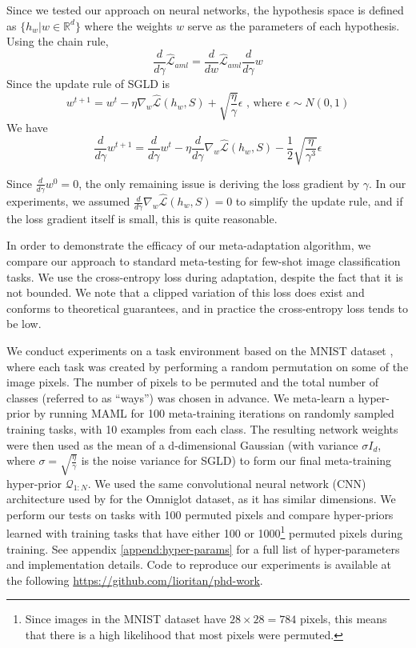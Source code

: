 \documentclass{article}
\theoremstyle{definition}
\begin{document}
Since we tested our approach on neural networks, the hypothesis space is defined as $\{h_w|w\in \mathbb{R}^d\}$ where the weights $w$ serve as the parameters of each hypothesis.
Using the chain rule, 
$$\frac{d}{d\gamma}\hat{\mathcal{L}}_{aml}=\frac{d}{dw}\hat{\mathcal{L}}_{aml}\frac{d}{d\gamma}w$$
Since the update rule of SGLD is 
$$w^{t+1}=w^t-\eta\nabla_w \hat{\mathcal{L}}(h_w,S)+\sqrt{\frac{\eta}{\gamma}}\epsilon \text{ , where } \epsilon\sim N(0,1)$$
We have
\begin{equation}
\frac{d}{d\gamma}w^{t+1}=\frac{d}{d\gamma}w^t-\eta\frac{d}{d\gamma}\nabla_w \hat{\mathcal{L}}(h_w,S)-\frac{1}{2}\sqrt{\frac{\eta}{\gamma^3}}\epsilon
\end{equation}

Since $\frac{d}{d\gamma}w^0=0$, the only remaining issue is deriving the loss gradient by $\gamma$. In our experiments, we assumed $\frac{d}{d\gamma}\nabla_w \hat{\mathcal{L}}(h_w,S)=0$ to simplify the update rule, and if the loss gradient itself is small, this is quite reasonable.

In order to demonstrate the efficacy of our meta-adaptation algorithm, we compare our approach to standard meta-testing for few-shot image classification tasks. 
We use the cross-entropy loss during adaptation, despite the fact that it is not bounded. We note that a clipped variation of this loss does exist and conforms to theoretical guarantees, and in practice the cross-entropy loss tends to be low.

We conduct experiments on a task environment based on the MNIST dataset \citep{LeCun1998}, where each task was created by performing a random permutation on some of the image pixels. The number of pixels to be permuted and the total number of classes (referred to as ``ways'') was chosen in advance. We meta-learn a hyper-prior by running MAML \citep{Finn2017} for 100 meta-training iterations on randomly sampled training tasks, with 10 examples from each class. The resulting network weights were then used as the mean of a d-dimensional Gaussian (with variance $\sigma I_d$, where $\sigma=\sqrt{\frac{\eta}{\gamma}}$ is the noise variance for SGLD) to form our final meta-training hyper-prior $\mathcal{Q}_{1:N}$. We used the same convolutional neural network (CNN) architecture used by \citet{Vinyals2016} for the Omniglot dataset, as it has similar dimensions. We perform our tests on tasks with 100 permuted pixels and compare hyper-priors learned with training tasks that have either 100 or 1000\footnote{Since images in the MNIST dataset have $28\times 28=784$ pixels, this means that there is a high likelihood that most pixels were permuted.} permuted pixels during training. See appendix \ref{append:hyper-params} for a full list of hyper-parameters and implementation details. Code to reproduce our experiments is available at the following \hyperlink{Github repository}{https://github.com/lioritan/phd-work}.
\end{document}
